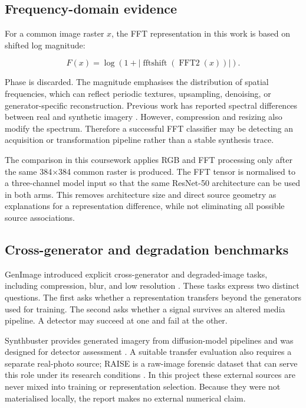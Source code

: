 \documentclass[12pt,a4paper]{article}
\begin{document}
\subsection{Frequency-domain evidence}

For a common image raster $x$, the FFT representation in this work is based on shifted log
magnitude:

\begin{equation}
  F(x)=\log\left(1+\left|\operatorname{fftshift}(\operatorname{FFT2}(x))\right|\right).
\end{equation}

Phase is discarded. The magnitude emphasises the distribution of spatial frequencies, which can
reflect periodic textures, upsampling, denoising, or generator-specific reconstruction. Previous
work has reported spectral differences between real and synthetic imagery
\cite{corvi2023intriguing,corvi2023detection}. However, compression and resizing also modify the
spectrum. Therefore a successful FFT classifier may be detecting an acquisition or transformation
pipeline rather than a stable synthesis trace.

The comparison in this coursework applies RGB and FFT processing only after the same 384×384 common
raster is produced. The FFT tensor is normalised to a three-channel model input so that the same
ResNet-50 architecture can be used in both arms. This removes architecture size and direct source
geometry as explanations for a representation difference, while not eliminating all possible
source associations.

\subsection{Cross-generator and degradation benchmarks}

GenImage introduced explicit cross-generator and degraded-image tasks, including compression,
blur, and low resolution \cite{zhu2023genimage}. These tasks express two distinct questions. The
first asks whether a representation transfers beyond the generators used for training. The second
asks whether a signal survives an altered media pipeline. A detector may succeed at one and fail at
the other.

Synthbuster provides generated imagery from diffusion-model pipelines and was designed for
detector assessment \cite{bammey2024synthbuster}. A suitable transfer evaluation also requires a
separate real-photo source; RAISE is a raw-image forensic dataset that can serve this role under its
research conditions \cite{dangnguyen2015raise}. In this project these external sources are never
mixed into training or representation selection. Because they were not materialised locally, the
report makes no external numerical claim.
\end{document}
